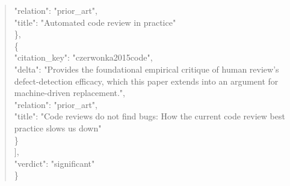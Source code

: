 \documentclass[11pt]{article}
\begin{document}
\begin{quote}
      "relation": "prior\_art",\\
      "title": "Automated code review in practice"\\
    \},\\
    \{\\
      "citation\_key": "czerwonka2015code",\\
      "delta": "Provides the foundational empirical critique of human review's defect-detection efficacy, which this paper extends into an argument for machine-driven replacement.",\\
      "relation": "prior\_art",\\
      "title": "Code reviews do not find bugs: How the current code review best practice slows us down"\\
    \}\\
  ],\\
  "verdict": "significant"\\
\}\\
\end{quote}
\end{document}
